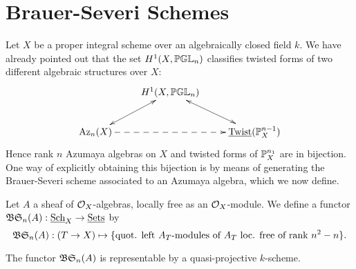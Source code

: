 \section{Brauer-Severi Schemes}
Let $X$ be a proper integral scheme over an algebraically closed field $k$.  We have already pointed out that the set $H^1(X,\mathbb{PGL}_n)$ classifies twisted forms of two different algebraic structures over $X$:
$$\xymatrix{
& \ar@{<->}[dl]H^1(X,\bbpgl_n) \ar@{<->}[dr]&\\
\Az_n(X)\ar@{-->}[rr] & & \twist(\bbp_X^{n-1})
}$$
Hence rank $n$ Azumaya algebras on $X$ and twisted forms of $\mathbb{P}^{n_1}_X$ are in bijection.  One way of explicitly obtaining this bijection is by means of generating the Brauer-Severi scheme associated to an Azumaya algebra, which we now define.

Let $A$ a sheaf of $\mathcal{O}_X$-algebras, locally free as an $\mathcal{O}_X$-module.  We define a functor $\mathfrak{BS}_n(A): \textnormal{\underline{Sch}}_X\rightarrow \textnormal{\underline{Sets}}$ by
$$\mathfrak{BS}_n(A): (T\rightarrow X)\mapsto \{\text{quot. left $A_T$-modules of $A_T$ loc. free of rank $n^2-n$}\}.$$
\begin{lem}
The functor $\mathfrak{BS}_n(A)$ is representable by a quasi-projective $k$-scheme.
\end{lem}
